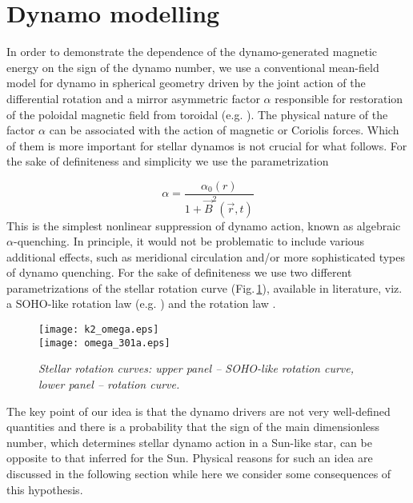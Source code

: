 \documentclass[fleqn,12pt]{SelfArx} %
\begin{document}
\section{Dynamo modelling}

In order to demonstrate the dependence of the dynamo-generated magnetic energy on the sign of the dynamo number, 
we use a conventional mean-field model for dynamo in spherical geometry driven by the joint action of the 
differential rotation and a mirror asymmetric factor $\alpha$ responsible for restoration of the poloidal 
magnetic field from toroidal (e.g. \cite{30}). The physical nature of the factor $\alpha$ can be associated with 
the action of magnetic or Coriolis forces. Which of them is more important for stellar dynamos is not crucial 
for what follows. For the sake of definiteness and simplicity we use the parametrization

\begin{equation}
\alpha = \frac{\alpha_0(r)}{1+\vec{B}^2({\vec r}, t)}
\label{alphpar}
\end{equation}
This is  the simplest nonlinear suppression of dynamo action, known as algebraic
$\alpha$-quenching. In principle, it would not be problematic to include various additional effects, such as 
meridional circulation and/or  more sophisticated types of dynamo quenching. For the sake of definiteness 
we use two different parametrizations of the stellar rotation curve (Fig.\,\ref{rotcurve}), available in literature, 
viz. a SOHO-like rotation law (e.g. \cite{31}) and the rotation law \cite{32}.

\begin{figure}
\texttt{[image: k2\_omega.eps]}\\[20pt]
\texttt{[image: omega\_301a.eps]}\\[10pt]
\caption{\normalsize\sl Stellar rotation curves: upper panel -- SOHO-like rotation curve, 
lower panel -- \cite{32} %
rotation curve.}
\label{rotcurve}
\end{figure}

The key point of our idea is that the dynamo drivers are not very well-defined quantities and there is a 
probability that the sign of the main dimensionless number, which determines stellar dynamo action in a Sun-like 
star, can be opposite to that inferred for the Sun.
Physical reasons for such an idea are discussed in the following section while here we consider some consequences 
of this hypothesis.
\end{document}
